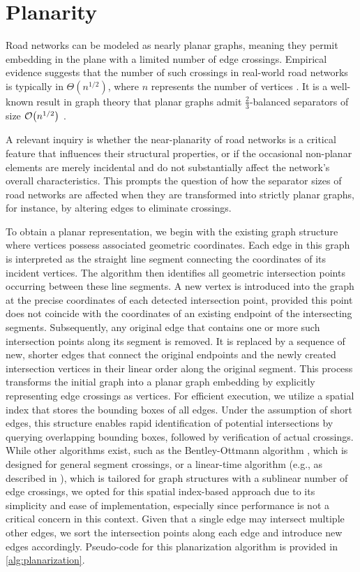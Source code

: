 \section{Planarity} \label{sec:approach:planarity}

Road networks can be modeled as nearly planar graphs, meaning they permit embedding in the plane with a limited number of edge crossings.
Empirical evidence suggests that the number of such crossings in real-world road networks is typically in \(\Theta\!\left(n^{1/2}\right)\), where \(n\) represents the number of vertices \cite{eppstein_studying_2008}.
It is a well-known result in graph theory that planar graphs admit \(\frac23\)-balanced
separators of size \(\mathcal{O}\!\left({n}^{1/2}\right)\) \cite{lipton_separator_1979}.

A relevant inquiry is whether the near-planarity of road networks is a critical
feature that influences their structural properties, or if the occasional
non-planar elements are merely incidental and do not substantially affect the
network’s overall characteristics. This prompts the question of how the
separator sizes of road networks are affected when they are transformed into
strictly planar graphs, for instance, by altering edges to eliminate crossings.

To obtain a planar representation, we begin with the existing graph structure where vertices possess associated geometric coordinates.
Each edge in this graph is interpreted as the straight line segment connecting the coordinates of its incident vertices.
The algorithm then identifies all geometric intersection points occurring between these line segments.
A new vertex is introduced into the graph at the precise coordinates of each detected intersection point, provided this point does not coincide with the coordinates of an existing endpoint of the intersecting segments.
Subsequently, any original edge that contains one or more such intersection points along its segment is removed.
It is replaced by a sequence of new, shorter edges that connect the original endpoints and the newly created intersection vertices in their linear order along the original segment.
This process transforms the initial graph into a planar graph embedding by explicitly representing edge crossings as vertices.
For efficient execution, we utilize a spatial index that stores the bounding boxes of all
edges. Under the assumption of short edges, this structure enables rapid
identification of potential intersections by querying overlapping bounding
boxes, followed by verification of actual crossings. While other algorithms
exist, such as the Bentley-Ottmann algorithm \cite{bentley_algorithms_1979},
which is designed for general segment crossings, or a linear-time algorithm
(e.g., as described in \cite{eppstein_linear-time_2010}), which is tailored for
graph structures with a sublinear number of edge crossings, we opted for this
spatial index-based approach due to its simplicity and ease of implementation,
especially since performance is not a critical concern in this context. Given
that a single edge may intersect multiple other edges, we sort the intersection
points along each edge and introduce new edges accordingly. Pseudo-code for
this planarization algorithm is provided in \cref{alg:planarization}.

